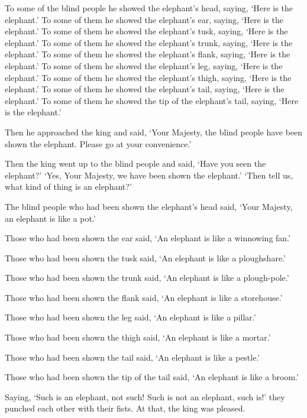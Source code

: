 \documentclass[12pt,openany]{book}%
\begin{document}
To some of the blind people he showed the elephant’s head, saying, ‘Here is the elephant.’ To some of them he showed the elephant’s ear, saying, ‘Here is the elephant.’ To some of them he showed the elephant’s tusk, saying, ‘Here is the elephant.’ To some of them he showed the elephant’s trunk, saying, ‘Here is the elephant.’ To some of them he showed the elephant’s flank, saying, ‘Here is the elephant.’ To some of them he showed the elephant’s leg, saying, ‘Here is the elephant.’ To some of them he showed the elephant’s thigh, saying, ‘Here is the elephant.’ To some of them he showed the elephant’s tail, saying, ‘Here is the elephant.’ To some of them he showed the tip of the elephant’s tail, saying, ‘Here is the elephant.’ 

Then he approached the king and said, ‘Your Majesty, the blind people have been shown the elephant. Please go at your convenience.’ 

Then the king went up to the blind people and said, ‘Have you seen the elephant?’ ‘Yes, Your Majesty, we have been shown the elephant.’ ‘Then tell us, what kind of thing is an elephant?’ 

The blind people who had been shown the elephant’s head said, ‘Your Majesty, an elephant is like a pot.’ 

Those who had been shown the ear said, ‘An elephant is like a winnowing fan.’ 

Those who had been shown the tusk said, ‘An elephant is like a ploughshare.’ 

Those who had been shown the trunk said, ‘An elephant is like a plough-pole.’ 

Those who had been shown the flank said, ‘An elephant is like a storehouse.’ 

Those who had been shown the leg said, ‘An elephant is like a pillar.’ 

Those who had been shown the thigh said, ‘An elephant is like a mortar.’ 

Those who had been shown the tail said, ‘An elephant is like a pestle.’ 

Those who had been shown the tip of the tail said, ‘An elephant is like a broom.’ 

Saying, ‘Such is an elephant, not such! Such is not an elephant, such is!’ they punched each other with their fists. At that, the king was pleased. 
\end{document}
